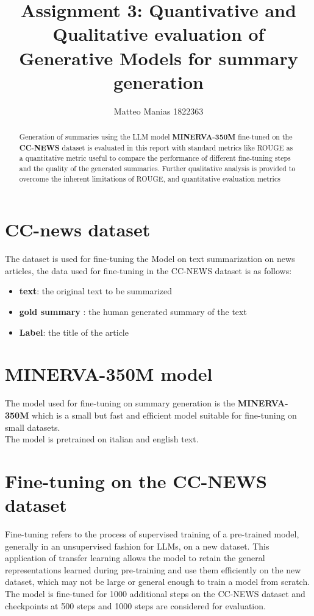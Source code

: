 \documentclass[11pt,a4paper]{article}
\title{Assignment 3: Quantivative and Qualitative evaluation of Generative Models for summary generation}
\author{Matteo Manias 1822363}
\date{}
\begin{document}
\maketitle
\begin{abstract}
Generation of summaries using the LLM model \textbf{MINERVA-350M} fine-tuned on the \textbf{CC-NEWS} dataset
is evaluated in this report with standard metrics like ROUGE as a quantitative metric useful to compare 
the performance of different fine-tuning steps and the quality of the generated summaries.
Further qualitative analysis is provided to overcome the inherent limitations of ROUGE, and quantitative evaluation metrics
\end{abstract}

\section{CC-news dataset}
The dataset is used for fine-tuning the Model on text summarization on news articles,
 the data used for fine-tuning in the CC-NEWS dataset is as follows:
\begin{itemize}
    \item \textbf{text}: the original text to be summarized
    \item \textbf{gold summary} : the human generated summary of the text
    \item \textbf{Label}: the title of the article
\end{itemize}

\section{MINERVA-350M model}
The model used for fine-tuning on summary generation is the \textbf{MINERVA-350M} which is a small
but fast and efficient model suitable for fine-tuning on small datasets. 
\\The model is pretrained on italian and english text.

\section{Fine-tuning on the CC-NEWS dataset}
Fine-tuning refers to the process of supervised training of a pre-trained model, generally in an unsupervised fashion for LLMs,
on a new dataset.
This application of transfer learning allows the model to retain the general representations learned during pre-training
and use them efficiently on the new dataset, which may not be large or general enough to train a model from scratch.
\\The model is fine-tuned for 1000 additional steps on the CC-NEWS dataset and checkpoints at 500 steps and 1000 steps
are considered for evaluation.
\end{document}
